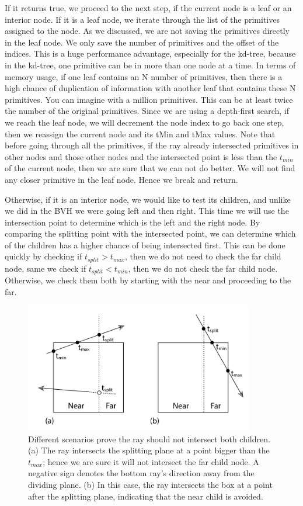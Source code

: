 \documentclass[11pt,a4paper]{article}
\begin{document}
If it returns true, we proceed to the next step, if the current node is a leaf or an interior node. If it is a leaf node, we iterate through the list of the primitives assigned to the node. As we discussed, we are not saving the primitives directly in the leaf node. We only save the number of primitives and the offset of the indices. This is a huge performance advantage, especially for the kd-tree, because in the kd-tree, one primitive can be in more than one node at a time. In terms of memory usage, if one leaf contains an N number of primitives, then there is a high chance of duplication of information with another leaf that contains these N primitives. You can imagine with a million primitives. This can be at least twice the number of the original primitives. Since we are using a depth-first search, if we reach the leaf node, we will decrement the node index to go back one step, then we reassign the current node and its tMin and tMax values. Note that before going through all the primitives, if the ray already intersected primitives in other nodes and those other nodes and the intersected point is less than the $t_{min}$ of the current node, then we are sure that we can not do better. We will not find any closer primitive in the leaf node. Hence we break and return. 
\\
\noindent


Otherwise, if it is an interior node, we would like to test its children, and unlike we did in the BVH we were going left and then right. This time we will use the intersection point to determine which is the left and the right node. By comparing the splitting point with the intersected point, we can determine which of the children has a higher chance of being intersected first. This can be done quickly by checking if $t_{split} > t_{max}$, then we do not need to check the far child node, same we check if $t_{split} < t_{min}$, then we do not check the far child node. Otherwise, we check them both by starting with the near and proceeding to the far. 

\begin{figure}[H]	
     \centering
         \includegraphics[width=10cm]{images/kdtree/traversal_case.png}
        \caption{Different scenarios prove the ray should not intersect both children.(a) The ray intersects the splitting plane at a point bigger than the $t_{max}$; hence we are sure it will not intersect the far child node. A negative sign denotes the bottom ray's direction away from the dividing plane. (b) In this case, the ray intersects the box at a point after the splitting plane, indicating that the  near child is avoided. \protect\cite{Pharr2016}}
        \label{fig:dice}
\end{figure}
\end{document}
